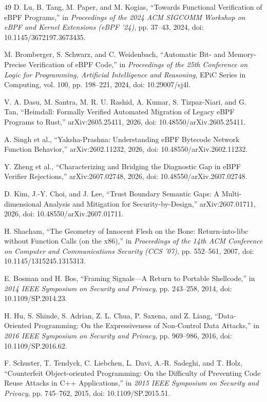 \documentclass[conference]{IEEEtran}
\begin{document}
\begin{thebibliography}{49}
D. Lu, B. Tang, M. Paper, and M. Kogias, ``Towards Functional Verification of eBPF Programs,'' in \emph{Proceedings of the 2024 ACM SIGCOMM Workshop on eBPF and Kernel Extensions (eBPF '24)}, pp. 37--43, 2024, doi: 10.1145/3672197.3673435.

M. Bromberger, S. Schwarz, and C. Weidenbach, ``Automatic Bit- and Memory-Precise Verification of eBPF Code,'' in \emph{Proceedings of the 25th Conference on Logic for Programming, Artificial Intelligence and Reasoning}, EPiC Series in Computing, vol. 100, pp. 198--221, 2024, doi: 10.29007/sj4l.

V. A. Dasu, M. Santra, M. R. U. Rashid, A. Kumar, S. Tizpaz-Niari, and G. Tan, ``Heimdall: Formally Verified Automated Migration of Legacy eBPF Programs to Rust,'' arXiv:2605.25411, 2026, doi: 10.48550/arXiv.2605.25411.

A. Singh et al., ``Yaksha-Prashna: Understanding eBPF Bytecode Network Function Behavior,'' arXiv:2602.11232, 2026, doi: 10.48550/arXiv.2602.11232.

Y. Zheng et al., ``Characterizing and Bridging the Diagnostic Gap in eBPF Verifier Rejections,'' arXiv:2607.02748, 2026, doi: 10.48550/arXiv.2607.02748.

D. Kim, J.-Y. Choi, and J. Lee, ``Trust Boundary Semantic Gaps: A Multi-dimensional Analysis and Mitigation for Security-by-Design,'' arXiv:2607.01711, 2026, doi: 10.48550/arXiv.2607.01711.

H. Shacham, ``The Geometry of Innocent Flesh on the Bone: Return-into-libc without Function Calls (on the x86),'' in \emph{Proceedings of the 14th ACM Conference on Computer and Communications Security (CCS '07)}, pp. 552--561, 2007, doi: 10.1145/1315245.1315313.

E. Bosman and H. Bos, ``Framing Signals---A Return to Portable Shellcode,'' in \emph{2014 IEEE Symposium on Security and Privacy}, pp. 243--258, 2014, doi: 10.1109/SP.2014.23.

H. Hu, S. Shinde, S. Adrian, Z. L. Chua, P. Saxena, and Z. Liang, ``Data-Oriented Programming: On the Expressiveness of Non-Control Data Attacks,'' in \emph{2016 IEEE Symposium on Security and Privacy}, pp. 969--986, 2016, doi: 10.1109/SP.2016.62.

F. Schuster, T. Tendyck, C. Liebchen, L. Davi, A.-R. Sadeghi, and T. Holz, ``Counterfeit Object-oriented Programming: On the Difficulty of Preventing Code Reuse Attacks in C++ Applications,'' in \emph{2015 IEEE Symposium on Security and Privacy}, pp. 745--762, 2015, doi: 10.1109/SP.2015.51.


\end{thebibliography}
\end{document}
